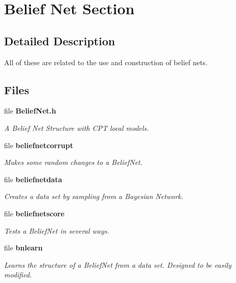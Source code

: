 \section{Belief Net Section}
\label{group__BeliefNet}


\subsection{Detailed Description}
All of these are related to the use and construction of belief nets. 

\subsection*{Files}
\begin{CompactItemize}
\item 
file {\bf Belief\-Net.h}
\begin{CompactList}\small\item\em A Belief Net Structure with CPT local models. \item\end{CompactList}

\item 
file {\bf beliefnetcorrupt}
\begin{CompactList}\small\item\em Makes some random changes to a Belief\-Net. \item\end{CompactList}

\item 
file {\bf beliefnetdata}
\begin{CompactList}\small\item\em Creates a data set by sampling from a Bayesian Network. \item\end{CompactList}

\item 
file {\bf beliefnetscore}
\begin{CompactList}\small\item\em Tests a Belief\-Net in several ways. \item\end{CompactList}

\item 
file {\bf bnlearn}
\begin{CompactList}\small\item\em Learns the structure of a Belief\-Net from a data set. Designed to be easily modified. \item\end{CompactList}


\end{CompactItemize}
